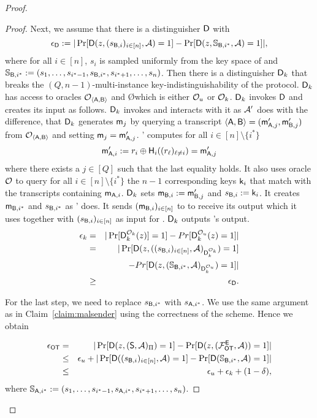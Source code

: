 \begin{proof}
\begin{proof}
Next, we assume that there is a distinguisher $\mathsf D$ with
$$
\epsilon_{\mathsf D}:=|\Pr[\mathsf D(z,(s_{\mathsf{B},i})_{i\in[n]},\mathcal{A})=1] -\Pr[\mathsf D(z,\mathsf{\mathbb S}_{\mathsf{B},i^*}, \mathcal{A})=1]|,
$$
where for all $i\in[n]$, $s_i$ is sampled uniformly from the key space of \UKA and $\mathsf{\mathbb S}_{\mathsf{B},i^*}:=(s_{1},\dots, s_{i^*-1},s_{\mathsf{B},i^*},s_{i^*+1},\dots, s_{n})$. Then there is a distinguisher $\mathsf D_k$ that breaks the $(Q,n-1)$-multi-instance key-indistinguishability of the \UKA protocol. $\mathsf D_k$ has access to oracles $\mathcal{O}_{\langle \mathsf{A},\mathsf{B}\rangle}$ and \O which is either $\mathcal{O}_u$ or $\mathcal{O}_k$. $\mathsf D_k$ invokes $\mathsf D$ and creates its input as follows. $\mathsf D_k$ invokes \Adv and interacts with it as $\mathcal{A}'$ does with the difference, that $\mathsf D_k$ generates $\mathsf{m}_j$ by querying a transcript $\langle \mathsf{A}, \mathsf{B}\rangle=(\mathsf{m}_{\mathsf{A},j}',\mathsf{m}_{\mathsf{B},j}')$ from $\mathcal{O}_{\langle \mathsf{A},\mathsf{B}\rangle}$ and setting $\mathsf{m}_j=\mathsf{m}_{\mathsf{A},j}'$. \Adv' computes for all $i\in[n]\setminus\{i^*\}$
$$
\mathsf{m}_{\mathsf{A},i}':=r_i\oplus\mathsf{H}_i((r_{\ell})_{\ell\neq i})=\mathsf{m}_{\mathsf{A},j}'
$$
where there exists a $j\in[Q]$ such that the last equality holds. It also uses oracle $\mathcal{O}$ to query for all $i\in[n]\setminus\{i^*\}$ the $n-1$ corresponding keys $\mathsf{k}_i$ that match with the transcripts containing $\mathsf{m}_{\mathsf{A},i}$. $\mathsf D_k$ sets $\mathsf{m}_{\mathsf{B},i}:=\mathsf{m}_{\mathsf{B},j}'$ and $s_{\mathsf{B},i}:=\mathsf{k}_i$. It creates $\mathsf{m}_{\mathsf{B},i^*}$ and $s_{\mathsf{B},i^*}$ as \Adv' does. It sends $(\mathsf{m}_{\mathsf{B},i})_{i\in[n]}$ to \Adv to receive its output which it uses together with $(s_{\mathsf{B},i})_{i\in[n]}$ as input for \D. $\mathsf D_k$ outputs \D's output.  
\begin{eqnarray*}
\epsilon_{k}&=&|\Pr[\mathsf D_k^{\mathcal{O}_{k}}(z)]=1]-Pr[\mathsf D_k^{\mathcal{O}_{u}}(z)=1]|\\
&= &|\Pr[\mathsf D(z,((s_{\mathsf{B},i})_{i\in[n]},\mathcal{A})_{\mathsf D_k^{\mathcal{O}_{k}}})=1]\\
&&-Pr[\mathsf D(z,(\mathsf{\mathbb S}_{\mathsf{B},i^*},\mathcal{A})_{\mathsf D_k^{\mathcal{O}_{u}}})=1]|\\
&\geq&\epsilon_{\mathsf D}.
\end{eqnarray*}

For the last step, we need to replace $s_{\mathsf{B},i^*}$ with $s_{\mathsf{A},i^*}$. We use the same argument as in Claim~\ref{claim:malsender} using the correctness of the scheme. Hence we obtain

\begin{eqnarray*}
\epsilon_{\mathsf{OT}} &=&|\Pr[\mathsf D(z,(\mathsf{S}, \mathcal{A})_{\Pi})=1] -\Pr[\mathsf D(z,(\mathcal{F}_{\mathsf{OT}}^\mathsf{E},\mathcal{A}))=1]|\\
&\leq & \epsilon_{u}+|\Pr[\mathsf D((s_{\mathsf{B},i})_{i\in[n]},\mathcal{A})=1]-\Pr[\mathsf D(\mathsf{\mathbb S}_{\mathsf{B},i^*}, \mathcal{A})=1]|\\
&\leq &\epsilon_{u}+\epsilon_{k}+(1-\delta),
\end{eqnarray*}
where $\mathsf{\mathbb S}_{\mathsf{A},i^*}:=(s_{1},\dots, s_{i^*-1},s_{\mathsf{A},i^*},s_{i^*+1},\dots, s_{n})$.
\pe
\end{proof}
\pe
\end{proof}

